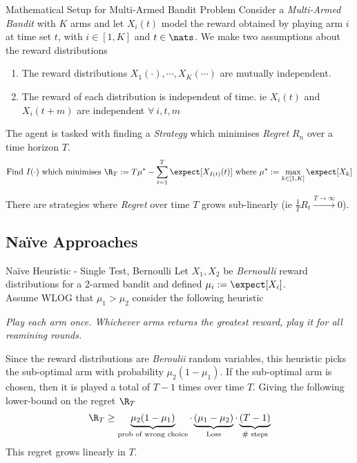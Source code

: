 \documentclass[11pt,a4paper]{article}
\begin{document}
  \begin{proposition}{Mathematical Setup for Multi-Armed Bandit Problem}
    Consider a \textit{Multi-Armed Bandit} with $K$ arms and let $X_i(t)$ model the reward obtained by playing arm $i$ at time set $t$, with $i\in[1,K]$ and $t\in\nats$. We make two assumptions about the reward distributions
    \begin{enumerate}
      \item The reward distributions $X_1(\cdot),\cdots,X_K(\cdots)$ are mutually independent.
      \item The reward of each distribution is independent of time. ie $X_i(t)$ and $X_i(t+m)$ are independent $\forall\ i,t,m$
    \end{enumerate}
    The agent is tasked with finding a \textit{Strategy} which minimises \textit{Regret} $R_n$ over a time horizon $T$.
    \[ \text{Find }I(\cdot)\text{ which minimises }\R_T:=T\mu^*-\sum_{t=1}^T\expect[X_{I(t)}(t)]\text{ where }\mu^*:=\max_{k\in[1,K]}\expect[X_k] \]
    \par There are strategies where \textit{Regret} over time $T$ grows sub-linearly (ie $\frac1TR_t\overset{T\to\infty}\longrightarrow0$).
  \end{proposition}

\subsection{Na\"ive Approaches} %

  \begin{proposition}{Na\"ive Heuristic - Single Test, Bernoulli}
    Let $X_1,X_2$ be \textit{Bernoulli} reward distributions for a 2-armed bandit and defined $\mu_i:=\expect[X_i]$.\\
    Assume WLOG that $\mu_1>\mu_2$ consider the following heuristic
    \begin{center}
      \textit{Play each arm once. Whichever arms returns the greatest reward, play it for all reamining rounds.}
    \end{center}
    Since the reward distributions are \textit{Beroulii} random variables, this heuristic picks the sub-optimal arm with probability $\mu_2(1-\mu_1)$. If the sub-optimal arm is chosen, then it is played a total of $T-1$ times over time $T$. Giving the following lower-bound on the regret $\R_T$
    \[ \R_T\geq\underbrace{\mu_2(1-\mu_1)}_{\tiny\text{prob of wrong choice}}\cdot\underbrace{(\mu_1-\mu_2)}_{\tiny\text{Loss}}\cdot\underbrace{(T-1)}_{\tiny\text{\# steps}} \]
    This regret grows linearly in $T$.
  \end{proposition}
\end{document}
